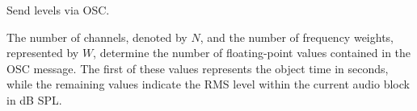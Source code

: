 Send levels via OSC.



The number of channels, denoted by $N$, and the number of frequency weights, represented by $W$, determine the number of floating-point values contained in the OSC message. The first of these values represents the object time in seconds, while the remaining values indicate the RMS level within the current audio block in dB SPL.


